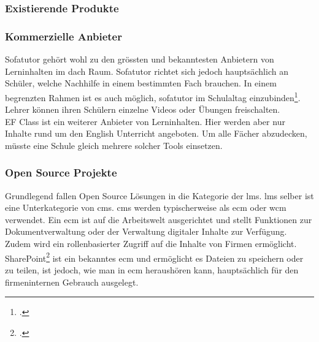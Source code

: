 \subsubsection{Existierende Produkte}
\subsubsection*{Kommerzielle Anbieter}
Sofatutor gehört wohl zu den grössten und bekanntesten Anbietern von Lerninhalten im \gls{dach} Raum. Sofatutor richtet sich jedoch hauptsächlich an Schüler, welche Nachhilfe in einem bestimmten Fach brauchen. In einem begrenzten Rahmen ist es auch möglich, sofatutor im Schulaltag einzubinden\footcite{sofatutor_fuer_lehrer}. Lehrer können ihren Schülern einzelne Videos oder Übungen freischalten. \\

EF Class ist ein weiterer Anbieter von Lerninhalten. Hier werden aber nur Inhalte rund um den English Unterricht angeboten. Um alle Fächer abzudecken, müsste eine Schule gleich mehrere solcher Tools einsetzen. \\


\subsubsection*{Open Source Projekte}
Grundlegend fallen Open Source Lösungen in die Kategorie der \gls{lms}. \gls{lms} selber ist eine Unterkategorie von \gls{cms}. \gls{cms} werden typischerweise als \gls{ecm} oder \gls{wcm} verwendet. Ein \gls{ecm} ist auf die Arbeitswelt ausgerichtet und stellt Funktionen zur Dokumentverwaltung oder der Verwaltung digitaler Inhalte zur Verfügung. Zudem wird ein rollenbasierter Zugriff auf die Inhalte von Firmen ermöglicht. SharePoint\footcite{sharepoint} ist ein bekanntes \gls{ecm} und ermöglicht es Dateien zu speichern oder zu teilen, ist jedoch, wie man in \gls{ecm} heraushören kann, hauptsächlich für den firmeninternen Gebrauch ausgelegt. \\

